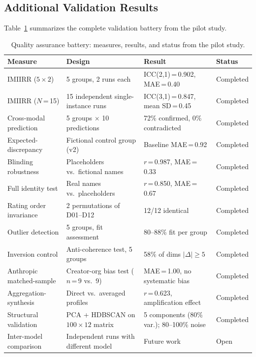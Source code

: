 \documentclass[11pt,a4paper]{article}
\begin{document}
\subsection{Additional Validation Results}
\label{sec:qa:additional}

Table~\ref{tab:validation} summarizes the complete validation battery from the pilot study.

\begin{table}[htbp]
  \centering
  \caption{Quality assurance battery: measures, results, and status from the pilot study.}
  \label{tab:validation}
  \scriptsize
  \begin{tabular}{@{} p{3.0cm} p{4.5cm} p{4.5cm} p{1.5cm} @{}}
    \toprule
    \textbf{Measure} & \textbf{Design} & \textbf{Result} & \textbf{Status} \\
    \midrule
    IMIIRR ($5 \times 2$) & 5 groups, 2 runs each & ICC(2,1)\,=\,0.902, MAE\,=\,0.40 & Completed \\[3pt]
    IMIIRR ($N$\,=\,15) & 15 independent single-instance runs & ICC(3,1)\,=\,0.847, mean SD\,=\,0.45 & Completed \\[3pt]
    Cross-modal prediction & 5 groups $\times$ 10 predictions & 72\% confirmed, 0\% contradicted & Completed \\[3pt]
    Expected-discrepancy & Fictional control group (v2) & Baseline MAE\,=\,0.92 & Completed \\[3pt]
    Blinding robustness & Placeholders vs.\ fictional names & $r$\,=\,0.987, MAE\,=\,0.33 & Completed \\[3pt]
    Full identity test & Real names vs.\ placeholders & $r$\,=\,0.850, MAE\,=\,0.67 & Completed \\[3pt]
    Rating order invariance & 2 permutations of D01--D12 & 12/12 identical & Completed \\[3pt]
    Outlier detection & 5 groups, fit assessment & 80--88\% fit per group & Completed \\[3pt]
    Inversion control & Anti-coherence test, 5 groups & 58\% of dims $|\Delta| \geq 5$ & Completed \\[3pt]
    Anthropic matched-sample & Creator-org bias test ($n$\,=\,9 vs.\ 9) & MAE\,=\,1.00, no systematic bias & Completed \\[3pt]
    Aggregation-synthesis & Direct vs.\ averaged profiles & $r$\,=\,0.623, amplification effect & Completed \\[3pt]
    Structural validation & PCA + HDBSCAN on $100 \times 12$ matrix & 5 components (80\% var.); 80--100\% noise & Completed \\[3pt]
    Inter-model comparison & Independent runs with different model & Future work & Open \\
    \bottomrule
  \end{tabular}
\end{table}
\end{document}
